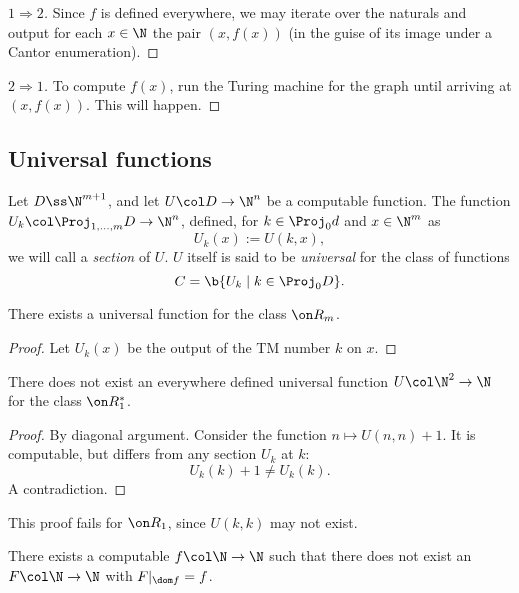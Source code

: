 \begin{proof}[$1 \Rightarrow 2$]
  Since $f$ is defined everywhere, we may iterate over the naturals and output for each $x \in \N$ the pair $(x, f(x))$ (in the guise of its image under a Cantor enumeration).
\end{proof}

\begin{proof}[$2 \Rightarrow 1$]
  To compute $f(x)$, run the Turing machine for the graph until arriving at $(x, f(x))$.
  This will happen.
\end{proof}

\subsection{Universal functions}

\begin{definition}
  Let $D \ss \N^{m+1}$, and let $U \col D \to \N^n$ be a computable function.
  The function $U_k \col \Proj_{1, \dots, m} D \to \N^n$, defined, for $k \in \Proj_0 d$ and $x \in \N^m$ as
  $$ U_{k}(x) := U(k, x), $$
  we will call a \emph{section} of $U$.
  $U$ itself is said to be \emph{universal} for the class of functions
  $$ C = \b{ U_k \mid k \in \Proj_0 D }. $$
\end{definition}

\begin{lemma}
  There exists a universal function for the class $\Comp_m$.
\end{lemma}

\begin{proof}
  Let $U_k(x)$ be the output of the TM number $k$ on $x$. 
\end{proof}

\begin{lemma}
  There does not exist an everywhere defined universal function $U \col \N^2 \to \N$ for the class $\Comp_1^*$.
\end{lemma}

\begin{proof}
  By diagonal argument.
  Consider the function $n \mapsto U(n, n)+1$.
  It is computable, but differs from any section $U_k$ at $k$:
  $$ U_k(k) + 1 \ne U_k(k). $$
  A contradiction.
\end{proof}

\begin{remark}
  This proof fails for $\Comp_1$, since $U(k, k)$ may not exist.
\end{remark}

\begin{lemma}
  There exists a computable $f \col \N \to \N$ such that there does not exist an $F \col \N \to \N$ with
  $ F|_{\dom f} = f$.
\end{lemma}

